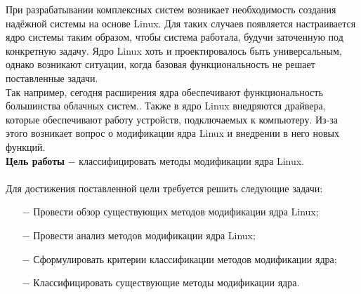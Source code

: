 
При разрабатывании комплексных систем возникает необходимость создания надёжной системы на основе Linux.
Для таких случаев появляется настраивается ядро системы таким образом,
чтобы система работала, будучи заточенную под конкретную задачу.
Ядро Linux хоть и проектировалось быть универсальным, однако возникают ситуации, когда базовая функциональность не решает поставленные задачи.\\

Так например, сегодня расширения ядра обеспечивают
функциональность большинства облачных систем.\cite{cloud-kernel}.
Также в ядро Linux внедряются драйвера, которые обеспечивают работу устройств, подключаемых к компьютеру.
Из-за этого возникает вопрос о модификации ядра Linux и внедрении в него новых функций.
\vspace{0.1cm}
\\
\textbf{Цель работы} $-$ классифицировать методы модификации ядра Linux.
\\
\vspace{0.1cm}
\\
Для достижения поставленной цели требуется решить следующие задачи: %
\begin{itemize}
    \item[$-$] Провести обзор существующих методов модификации ядра Linux;
    \item[$-$] Провести анализ методов модификации ядра Linux;
    \item[$-$] Сформулировать критерии классификации методов модификации ядра;
    \item[$-$] Классифицировать существующие методы модификации ядра.
\end{itemize}
